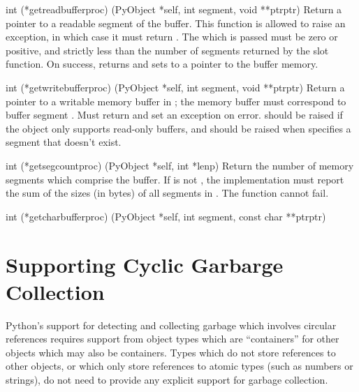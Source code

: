 \documentclass{manual}
\begin{document}
\begin{ctypedesc}[getreadbufferproc]{int (*getreadbufferproc)
                            (PyObject *self, int segment, void **ptrptr)}
Return a pointer to a readable segment of the buffer.  This function
is allowed to raise an exception, in which case it must return
.  The  which is passed must be zero or
positive, and strictly less than the number of segments returned by
the  slot function.  On success, returns
 and sets  to a pointer to the buffer
memory.
\end{ctypedesc}

\begin{ctypedesc}[getwritebufferproc]{int (*getwritebufferproc)
                            (PyObject *self, int segment, void **ptrptr)}
Return a pointer to a writable memory buffer in ;
the memory buffer must correspond to buffer segment .
Must return  and set an exception on error.
 should be raised if the object only supports
read-only buffers, and  should be raised when
 specifies a segment that doesn't exist.
\end{ctypedesc}

\begin{ctypedesc}[getsegcountproc]{int (*getsegcountproc)
                            (PyObject *self, int *lenp)}
Return the number of memory segments which comprise the buffer.  If
 is not \NULL, the implementation must report the sum of the 
sizes (in bytes) of all segments in .
The function cannot fail.
\end{ctypedesc}

\begin{ctypedesc}[getcharbufferproc]{int (*getcharbufferproc)
                            (PyObject *self, int segment, const char **ptrptr)}
\end{ctypedesc}


\section{Supporting Cyclic Garbarge Collection
         \label{supporting-cycle-detection}}

Python's support for detecting and collecting garbage which involves
circular references requires support from object types which are
``containers'' for other objects which may also be containers.  Types
which do not store references to other objects, or which only store
references to atomic types (such as numbers or strings), do not need
to provide any explicit support for garbage collection.
\end{document}
